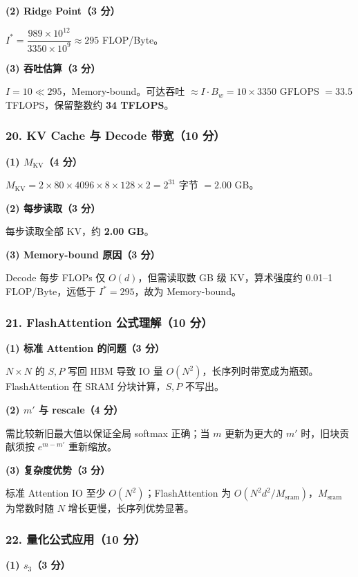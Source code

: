 \documentclass[11pt,a4paper]{article}
\begin{document}
\noindent\textbf{(2) Ridge Point（3 分）}

$I^*=\dfrac{989\times10^{12}}{3350\times10^9}\approx295$ FLOP/Byte。

\noindent\textbf{(3) 吞吐估算（3 分）}

$I=10\ll 295$，Memory-bound。可达吞吐 $\approx I\cdot B_w=10\times3350$ GFLOPS $=33.5$ TFLOPS，保留整数约 \textbf{34 TFLOPS}。

\subsubsection*{20. KV Cache 与 Decode 带宽（10 分）}

\noindent\textbf{(1) $M_{\mathrm{KV}}$（4 分）}

$M_{\mathrm{KV}}=2\times80\times4096\times8\times128\times2=2^{31}$ 字节 $=2.00$ GB。

\noindent\textbf{(2) 每步读取（3 分）}

每步读取全部 KV，约 \textbf{2.00 GB}。

\noindent\textbf{(3) Memory-bound 原因（3 分）}

Decode 每步 FLOPs 仅 $O(d)$，但需读取数 GB 级 KV，算术强度约 0.01--1 FLOP/Byte，远低于 $I^*=295$，故为 Memory-bound。

\subsubsection*{21. FlashAttention 公式理解（10 分）}

\noindent\textbf{(1) 标准 Attention 的问题（3 分）}

$N\times N$ 的 $S,P$ 写回 HBM 导致 IO 量 $O(N^2)$，长序列时带宽成为瓶颈。FlashAttention 在 SRAM 分块计算，$S,P$ 不写出。

\noindent\textbf{(2) $m'$ 与 rescale（4 分）}

需比较新旧最大值以保证全局 softmax 正确；当 $m$ 更新为更大的 $m'$ 时，旧块贡献须按 $e^{m-m'}$ 重新缩放。

\noindent\textbf{(3) 复杂度优势（3 分）}

标准 Attention IO 至少 $O(N^2)$；FlashAttention 为 $O(N^2d^2/M_{\mathrm{sram}})$，$M_{\mathrm{sram}}$ 为常数时随 $N$ 增长更慢，长序列优势显著。

\subsubsection*{22. 量化公式应用（10 分）}

\noindent\textbf{(1) $s_3$（3 分）}
\end{document}
